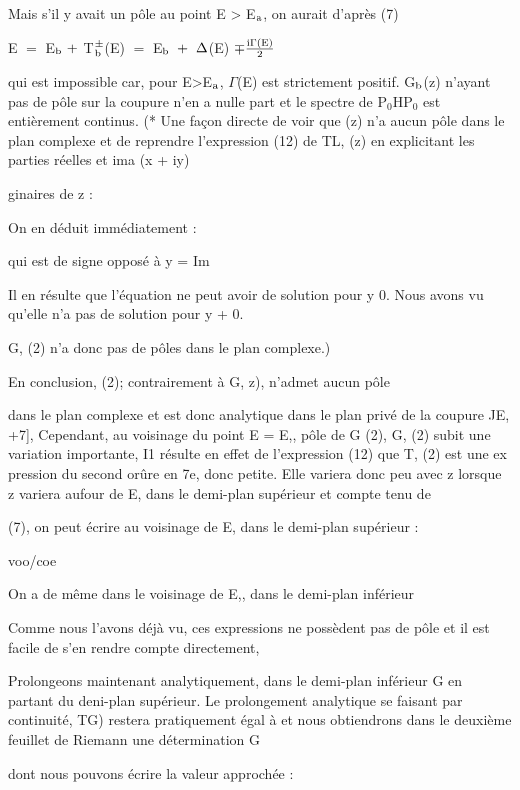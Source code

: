 Mais s'il y avait un pôle au point E > E$_{\text{a}}$, on aurait d'après (7)
\begin{center}
E $=$ E$_{\text{b}}\ +$ T$_{\text{b}}^\pm$(E) $=$ E$_{\text{b}}\ +\ \Delta$(E) $\mp\frac{\text{i}\Gamma\text{(E)}}{2}$
\end{center}
qui est impossible car, pour E>E$_{\text{a}}$, $\Gamma$(E) est strictement positif.
G$_{\text{b}}$(z) n'ayant pas de pôle sur la coupure n'en a nulle part et le spectre
de P$_0$HP$_0$ est entièrement continus. (* Une façon directe de voir que (z) n'a aucun pôle dans le plan complexe et de
reprendre l'expression (12) de TL, (z) en explicitant les parties réelles et ima
(x + iy) 

ginaires de z : 


On en déduit immédiatement :

 qui est de signe opposé à y = Im 

Il en résulte que l'équation  ne peut avoir
de solution pour y  0. Nous avons vu qu'elle n'a pas de solution pour y + 0.

G, (2) n'a donc pas de pôles dans le plan complexe.)

En conclusion, (2); contrairement à G, z), n'admet aucun pôle

dans le plan complexe et est donc analytique dans le plan privé de la coupure
JE, +7],
Cependant, au voisinage du point E = E,, pôle de G (2), G, (2)
subit une variation importante,
I1 résulte en effet de l'expression (12) que T, (2) est une ex
pression du second orûre en 7e, donc petite. Elle variera donc peu avec z
lorsque z variera aufour de E, dans le demi-plan supérieur et compte tenu de

(7), on peut écrire au voisinage de E, dans le demi-plan supérieur :

voo/coe





On a de même dans le voisinage de E,, dans le demi-plan inférieur

Comme nous l'avons déjà vu, ces expressions ne possèdent pas de
pôle et il est facile de s'en rendre compte directement,

Prolongeons maintenant analytiquement, dans le demi-plan inférieur G en partant du deni-plan supérieur. Le prolongement analytique se
faisant par continuité, TG) restera pratiquement égal à  et nous
obtiendrons dans le deuxième feuillet de Riemann une détermination G

dont nous pouvons écrire la valeur approchée :

